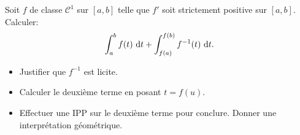 Soit $f$ de classe $\mathscr{C}^1$ sur $[a, b]$ telle que $f'$ soit strictement positive sur $[a, b]$. Calculer:
$$\int_{a}^{b} f(t)\ \mathrm{d} t + \int_{f(a)}^{f(b)} f^{-1}(t)\ \mathrm{d} t.$$

\begin{itemize}
    \item Justifier que $f^{-1}$ est licite. 
    \item Calculer le deuxième terme en posant $t = f(u)$.
    \item Effectuer une IPP sur le deuxième terme pour conclure. 
    Donner une interprétation géométrique.
\end{itemize}